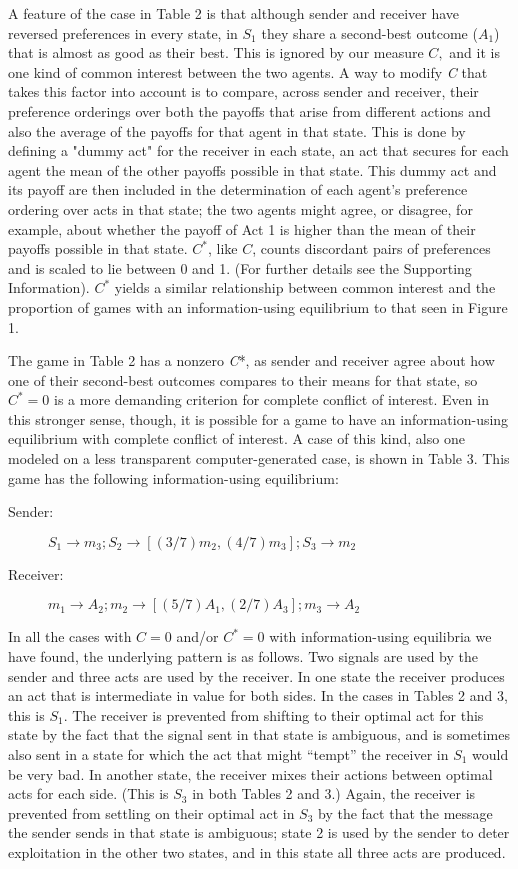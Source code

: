 \documentclass[10pt]{article}
\begin{document}
A feature of the case in Table 2 is that although sender and receiver
have reversed preferences in every state, in $S_1$ they share a second-best
outcome ($A_1$) that is almost as good as their best. This is ignored by
our measure $C,$ and it is one kind of common interest between the two
agents. A way to modify \emph{C} that takes this factor into account is
to compare, across sender and receiver, their preference orderings over
both the payoffs that arise from different actions and also the average
of the payoffs for that agent in that state. This is done by defining a "dummy act" for the receiver in each state, an act that secures for each agent the mean of the other payoffs possible in that state. This dummy act and its payoff are then included in the determination of each agent's preference ordering over acts in that state; the two agents might agree, or disagree, for example, about whether the payoff of Act 1 is higher than the mean of their payoffs possible in that state. $C^*$, like $C$, counts discordant pairs of preferences and is scaled to lie between 0 and 1. (For further details see the Supporting Information).  $C^*$ yields
a similar relationship between common interest and the proportion of
games with an information-using equilibrium to that seen in Figure 1.

The game in Table 2 has a nonzero \emph{C}*, as sender and receiver
agree about how one of their second-best outcomes compares to their
means for that state, so $C^*=0$ is a more demanding criterion for
complete conflict of interest. Even in this stronger sense, though, it
is possible for a game to have an information-using equilibrium with
complete conflict of interest. A case of this kind, also one modeled on
a less transparent computer-generated case, is shown in Table 3. This
game has the following information-using equilibrium:

\begin{description}
\item[Sender:]
$S_1\rightarrow m_3; S_2\rightarrow [(3/7) m_2, (4/7) m_3]; S_3\rightarrow m_2$
\item[Receiver:]
$m_1\rightarrow A_2; m_2\rightarrow [(5/7)A_1, (2/7)A_3]; m_3\rightarrow A_2$
\end{description}

In all the cases with $C=0$ and/or $C^*=0$ with information-using
equilibria we have found, the underlying pattern is as follows. Two
signals are used by the sender and three acts are used by the receiver.
In one state the receiver produces an act that is intermediate in value
for both sides. In the cases in Tables 2 and 3, this is $S_1$. The receiver is
prevented from shifting to their optimal act for this state by the fact
that the signal sent in that state is ambiguous, and is sometimes also
sent in a state for which the act that might ``tempt'' the receiver in
$S_1$ would be very bad. In another state, the receiver mixes their actions
between optimal acts for each side. (This is $S_3$ in both Tables
2 and 3.) Again, the receiver is prevented from settling on their optimal act
in $S_3$ by the fact that the message the sender sends in that state is
ambiguous; state 2 is used by the sender to deter exploitation in the
other two states, and in this state all three acts are produced.
\end{document}
